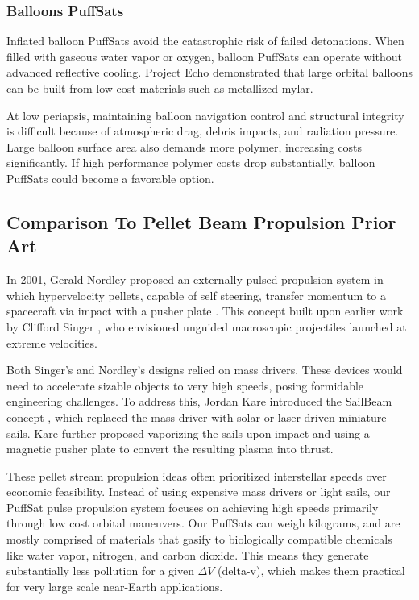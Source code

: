 \documentclass{article}
\begin{document}
\subsubsection{Balloons PuffSats}
Inflated balloon PuffSats avoid the catastrophic risk of failed detonations.  When filled with gaseous water vapor or oxygen, balloon PuffSats can operate without advanced reflective cooling. Project Echo \cite{JPL_EchoQL2010} demonstrated that large orbital balloons can be built from low cost materials such as metallized mylar.

At low periapsis, maintaining balloon navigation control and structural integrity is difficult because of  atmospheric drag, debris impacts, and radiation pressure. Large balloon surface area also demands more polymer, increasing costs significantly. If high performance polymer costs drop substantially, balloon PuffSats could become a favorable option.

\subsection{Comparison To Pellet Beam Propulsion Prior Art}
In 2001, Gerald Nordley proposed an externally pulsed propulsion system in which hypervelocity pellets, capable of self steering, transfer momentum to a spacecraft via impact with a pusher plate \cite{nordley2001interstellar}. This concept built upon earlier work by Clifford Singer \cite{singer1979interstellar}, who envisioned unguided macroscopic projectiles launched at extreme velocities. 

Both Singer’s and Nordley’s designs relied on mass drivers.  These devices would need to accelerate sizable objects to very high speeds, posing formidable engineering challenges. To address this, Jordan Kare introduced the SailBeam concept \cite{kare2001sailbeam}, which replaced the mass driver with solar or laser driven miniature sails. Kare further proposed vaporizing the sails upon impact and using a magnetic pusher plate to convert the resulting plasma into thrust.   

These pellet stream propulsion ideas often prioritized interstellar speeds over economic feasibility.  Instead of using expensive mass drivers or light sails, our PuffSat pulse propulsion system focuses on achieving high speeds primarily through low cost orbital maneuvers.   Our PuffSats can weigh kilograms, and are mostly comprised of materials that gasify to biologically compatible chemicals like water vapor, nitrogen, and carbon dioxide.   This means they generate substantially less pollution for a given $\Delta V$ (delta-v), which makes them practical for very large scale near-Earth applications.  
\end{document}
